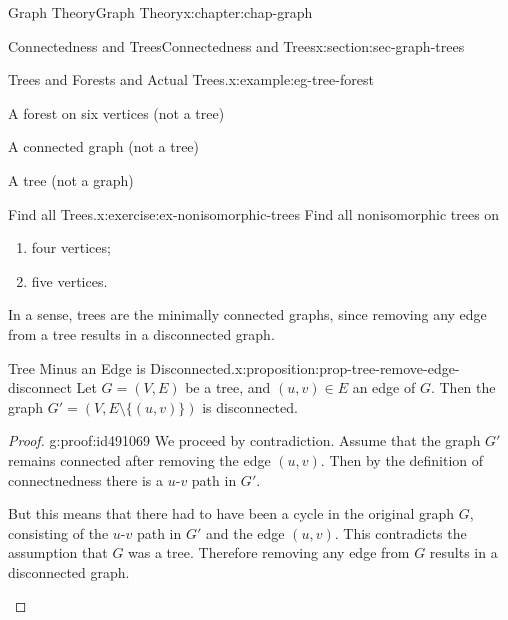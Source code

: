 \documentclass[oneside,10pt,]{book}
\numberwithin{equation}{section}
\begin{document}
\begin{chapterptx}{Graph Theory}{}{Graph Theory}{}{}{x:chapter:chap-graph}
\begin{sectionptx}{Connectedness and Trees}{}{Connectedness and Trees}{}{}{x:section:sec-graph-trees}
\begin{example}{Trees and Forests and Actual Trees.}{x:example:eg-tree-forest}
\begin{sidebyside}{4}{0.0275}{0.0275}{0.055}
\begin{sbspanel}{0.2}
A forest on six vertices (not a tree)%
\end{sbspanel}%
\begin{sbspanel}{0.2}%
\par
A connected graph (not a tree)%
\end{sbspanel}%
\begin{sbspanel}{0.18}%
\par
A tree (not a graph)%
\end{sbspanel}%
\end{sidebyside}%
\end{example}
\begin{inlineexercise}{Find all Trees.}{x:exercise:ex-nonisomorphic-trees}%
Find all nonisomorphic trees on%
\begin{enumerate}[label=(\alph*)]
\item{}four vertices;%
\item{}five vertices.%
\end{enumerate}
%
\end{inlineexercise}
In a sense, trees are the minimally connected graphs, since removing any edge from a tree results in a disconnected graph.%
\begin{proposition}{Tree Minus an Edge is Disconnected.}{}{x:proposition:prop-tree-remove-edge-disconnect}%
Let \(G = (V,E)\) be a tree, and \((u,v) \in E\) an edge of \(G\). Then the graph \(G' = \left(V, E \setminus \{(u,v)\}\right)\) is disconnected.%
\end{proposition}
\begin{proof}{}{g:proof:id491069}
We proceed by contradiction. Assume that the graph \(G'\) remains connected after removing the edge \((u,v)\). Then by the definition of connectnedness there is a \(u\)-\(v\) path in \(G'\).%
\begin{sidebyside}{2}{0}{0}{0.07}%
\begin{sbspanel}{0.75}%
But this means that there had to have been a cycle in the original graph \(G\), consisting of the \(u\)-\(v\) path in \(G'\) and the edge \((u,v)\). This contradicts the assumption that \(G\) was a tree. Therefore removing any edge from \(G\) results in a disconnected graph.%
\end{sbspanel}%
\begin{sbspanel}{0.18}%
\end{sbspanel}
\end{sidebyside}
\end{proof}
\end{sectionptx}
\end{chapterptx}
\end{document}
